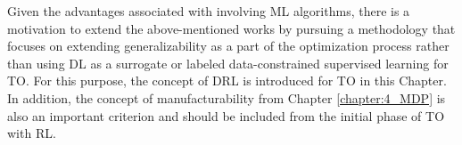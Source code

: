 Given the advantages associated with involving ML algorithms, there is a motivation to extend the above-mentioned works by pursuing a methodology that focuses on extending generalizability as a part of the optimization process rather than using DL as a surrogate or labeled data-constrained supervised learning for TO. For this purpose, the concept of DRL is introduced for TO in this Chapter. 
In addition, the concept of manufacturability from Chapter \ref{chapter:4_MDP} is also an important criterion and should be included from the initial phase of TO with RL.

